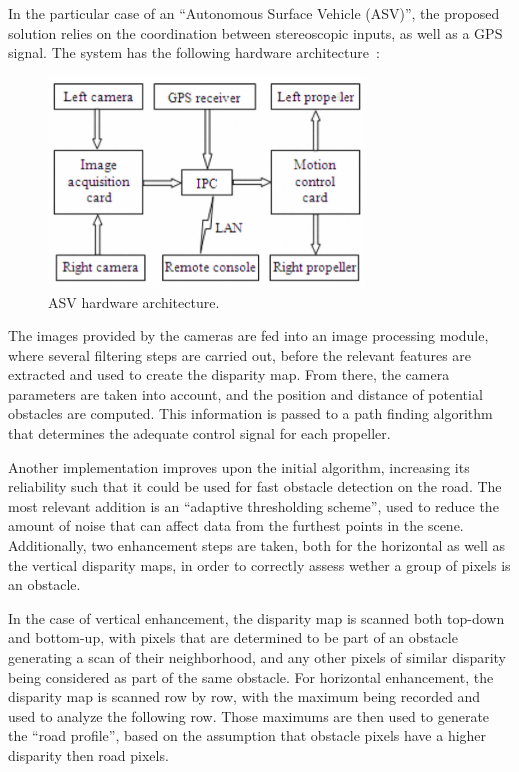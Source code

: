 In the particular case of an ``Autonomous Surface Vehicle (ASV)'', the proposed solution relies on the
coordination between stereoscopic inputs, as well as a GPS signal. The system has the following hardware
architecture~\cite{withNavigation}:

\begin{figure}[H]
    \includegraphics[width=0.75\textwidth, height=0.35\textwidth]{resources/png/boat_architecture.png}
    \caption{ASV hardware architecture.~\cite{withNavigation}~\label{figNav}}
\end{figure}

The images provided by the cameras are fed into an image processing module, where several filtering steps
are carried out, before the relevant features are extracted and used to create the disparity map. From 
there, the camera parameters are taken into account, and the position and distance of potential obstacles
are computed. This information is passed to a path finding algorithm that determines the adequate control
signal for each propeller.

Another implementation improves upon the initial algorithm, increasing its reliability such that it could
be used for fast obstacle detection on the road. The most relevant addition is an ``adaptive thresholding
scheme'', used to reduce the amount of noise that can affect data from the furthest points in the scene.
Additionally, two enhancement steps are taken, both for the horizontal as well as the vertical disparity
maps, in order to correctly assess wether a group of pixels is an obstacle.~\cite{withMain}

In the case of vertical enhancement, the disparity map is scanned both top-down and bottom-up, with 
pixels that are determined to be part of an obstacle generating a scan of their neighborhood, and any
other pixels of similar disparity being considered as part of the same obstacle. For horizontal 
enhancement, the disparity map is scanned row by row, with the maximum being recorded and used to 
analyze the following row. Those maximums are then used to generate the ``road profile'', based on the
assumption that obstacle pixels have a higher disparity then road pixels.~\cite{withMain}

